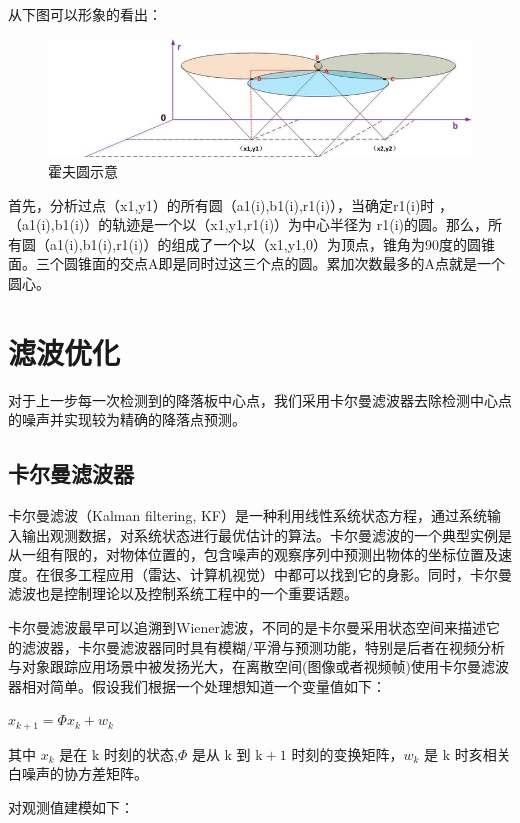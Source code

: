 从下图可以形象的看出：

\begin{figure}[ht]
  \centering
  \includegraphics[width=0.8\linewidth]{./Figure/Hough_Circle.png}
  \caption{霍夫圆示意}\label{Fig:xd1}
\end{figure}

⾸先，分析过点（x1,y1）的所有圆（a1(i),b1(i),r1(i)），当确定r1(i)时 ，（a1(i),b1(i)）的轨迹是⼀个以（x1,y1,r1(i)）为中心半径为 r1(i)的圆。那么，所有圆（a1(i),b1(i),r1(i)）的组成了⼀个以（x1,y1,0）为顶点，锥角为90度的圆锥⾯。三个圆锥面的交点A即是同时过这三个点的圆。累加次数最多的A点就是一个圆⼼。

\section{滤波优化}

对于上一步每一次检测到的降落板中心点，我们采用卡尔曼滤波器去除检测中心点的噪声并实现较为精确的降落点预测。

\subsection{卡尔曼滤波器}

卡尔曼滤波（Kalman filtering, KF）是一种利用线性系统状态方程，通过系统输入输出观测数据，对系统状态进行最优估计的算法。卡尔曼滤波的一个典型实例是从一组有限的，对物体位置的，包含噪声的观察序列中预测出物体的坐标位置及速度。在很多工程应用（雷达、计算机视觉）中都可以找到它的身影。同时，卡尔曼滤波也是控制理论以及控制系统工程中的一个重要话题。

卡尔曼滤波最早可以追溯到Wiener滤波，不同的是卡尔曼采用状态空间来描述它的滤波器，卡尔曼滤波器同时具有模糊/平滑与预测功能，特别是后者在视频分析与对象跟踪应用场景中被发扬光大，在离散空间(图像或者视频帧)使用卡尔曼滤波器相对简单。假设我们根据一个处理想知道一个变量值如下：

$x_{k+1}=\Phi x_{k}+w_{k}$

其中 $x_{k}$ 是在 $\mathrm{k}$ 时刻的状态,$\Phi$ 是从 $\mathrm{k}$ 到 $\mathrm{k}+1$ 时刻的变换矩阵，$w_{k}$ 是 $\mathrm{k}$ 时亥相关白噪声的协方差矩阵。

对观测值建模如下：

